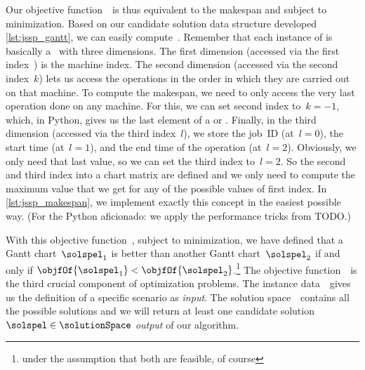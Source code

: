 Our objective function~\objf\ is thus equivalent to the makespan and subject to minimization.
Based on our candidate solution data structure  developed \cref{lst:jssp_gantt}, we can easily compute~\objf.
Remember that each instance of  is basically a \numpyndarray\ with three dimensions.
The first dimension (accessed via the first index~\jsspMachineIndex) is the machine index.
The second dimension (accessed via the second index~$k$) lets us access the operations in the order in which they are carried out on that machine.
To compute the makespan, we need to only access the very last operation done on any machine.
For this, we can set second index to~$k=-1$, which, in Python, gives us the last element of a  or \numpyndarray.
Finally, in the third dimension (accessed via the third index~$l$), we store the job~ID (at~$l=0$), the start time (at~$l=1$), and the end time of the operation (at~$l=2$).
Obviously, we only need that last value, so we can set the third index to~$l=2$.
So the second and third index into a  chart matrix are defined and we only need to compute the maximum value that we get for any of the possible values of first index.
In \cref{lst:jssp_makespan}, we implement exactly this concept in the easiest possible way.
(For the Python aficionado: we apply the performance tricks from TODO.)


With this objective function~\objf, subject to minimization, we have defined that a Gantt chart~$\solspel_1$ is better than another Gantt chart~$\solspel_2$ if and only if $\objfOf{\solspel_1}<\objfOf{\solspel_2}$.\footnote{under the assumption that both are feasible, of course}
\endhsection%
%
%
%
The objective function~\objf\ is the third crucial component of optimization problems.
The instance data~\instance\ gives us the definition of a specific scenario as \emph{input}.
The solution space~\solutionSpace\ contains all the possible solutions and we will return at least one candidate solution~$\solspel\in\solutionSpace$ \emph{output} of our algorithm.
%
%
%
\endhsection%
\endhsection%
%
